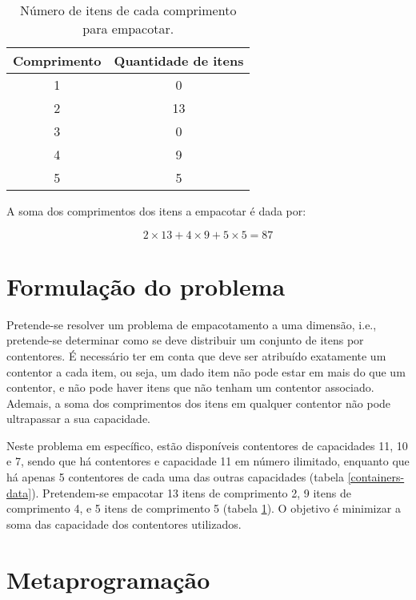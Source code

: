 \documentclass[12pt, a4paper, titlepage]{article}
\begin{document}
\begin{table}[H]
    \begin{center}
        \begin{tabular}{c|c}
            Comprimento & Quantidade de itens \\
            \hline
            1           & 0                    \\
            2           & 13                   \\
            3           & 0                    \\
            4           & 9                    \\
            5           & 5
        \end{tabular}
    \end{center}
    \caption{Número de itens de cada comprimento para empacotar.}
    \label{items-data}
\end{table}

A soma dos comprimentos dos itens a empacotar é dada por:

$$2 \times 13 + 4 \times 9 + 5 \times 5 = 87$$

\section{Formulação do problema}

Pretende-se resolver um problema de empacotamento a uma dimensão, i.e., pretende-se determinar como
se deve distribuir um conjunto de itens por contentores. É necessário ter em conta que deve ser
atribuído exatamente um contentor a cada item, ou seja, um dado item não pode estar em mais do que
um contentor, e não pode haver itens que não tenham um contentor associado. Ademais, a soma dos
comprimentos dos itens em qualquer contentor não pode ultrapassar a sua capacidade.

Neste problema em específico, estão disponíveis contentores de capacidades 11, 10 e 7, sendo que há
contentores e capacidade 11 em número ilimitado, enquanto que há apenas 5 contentores de cada uma
das outras capacidades (tabela \ref{containers-data}). Pretendem-se empacotar 13 itens de
comprimento 2, 9 itens de comprimento 4, e 5 itens de comprimento 5 (tabela \ref{items-data}). O
objetivo é minimizar a soma das capacidade dos contentores utilizados.


\section{Metaprogramação}
\end{document}
